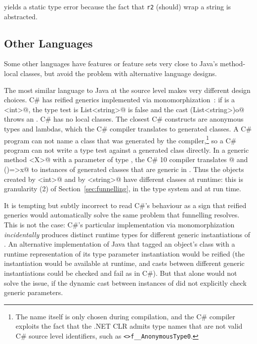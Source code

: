 \noindent
yields a static type error because the fact that \texttt{r2} (should) wrap a string is abstracted.

\subsection{Other Languages}
Some other languages have features or feature sets very close to Java's method-local classes, but avoid the problem with alternative language designs.

The most similar language to Java at the source level makes very different design choices.
C\# has reified generics implemented via monomorphization~\cite{kennedy2001design}: if \Q@o@ is a \Q@List<int>@, the type test \Q@o is List<string>@ is false and the cast \Q@(List<string>)o@ throws an \Q@InvalidCastException@.
C\# has no local classes.
The closest C\# constructs are anonymous types and lambdas, which the C\# compiler translates to generated classes.
A C\# program can not name a class that was generated by the compiler,\footnote{The name itself is only chosen during compilation, and the C\# compiler exploits the fact that the .NET CLR admits type names that are not valid C\# source level identifiers, such as \lstinline|<>f__AnonymousType0|.} so a C\# program can not write a type test against a generated class directly.
In a generic method \Q@M<X>@ with a parameter \Q@x@ of type \Q@X@, the C\# 10 compiler translates @ and \Q@()=>x@ to instances of generated classes that are generic in \Q@X@.
Thus the objects created by \Q@M<int>@ and by \Q@M<string>@ have different classes at runtime: this is granularity (2) of Section~\ref{sec:funnelling}, in the type system and at run time.

It is tempting but subtly incorrect to read C\#'s behaviour as a sign that reified generics would automatically solve the same problem that funnelling resolves. This is not the case: C\#'s particular implementation via monomorphization \emph{incidentally} produces distinct runtime types for different generic instantiations of \Q@M@. An alternative implementation of Java that tagged an object's class with a runtime representation of its type parameter instantiation would be reified (the instantiation would be available at runtime, and casts between different generic instantiations could be checked and fail as in C\#). But that alone would not solve the issue, if the dynamic cast between instances of \Q@MyFoo@ did not explicitly check generic parameters.


